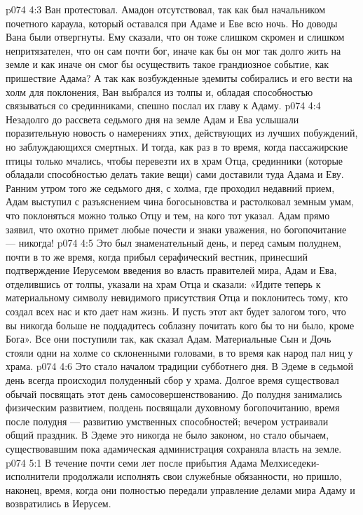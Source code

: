 \vs p074 4:3 Ван протестовал. Амадон отсутствовал, так как был начальником почетного караула, который оставался при Адаме и Еве всю ночь. Но доводы Вана были отвергнуты. Ему сказали, что он тоже слишком скромен и слишком непритязателен, что он сам почти бог, иначе как бы он мог так долго жить на земле и как иначе он смог бы осуществить такое грандиозное событие, как пришествие Адама? А так как возбужденные эдемиты собирались и его вести на холм для поклонения, Ван выбрался из толпы и, обладая способностью связываться со срединниками, спешно послал их главу к Адаму.
\vs p074 4:4 Незадолго до рассвета седьмого дня на земле Адам и Ева услышали поразительную новость о намерениях этих, действующих из лучших побуждений, но заблуждающихся смертных. И тогда, как раз в то время, когда пассажирские птицы только мчались, чтобы перевезти их в храм Отца, срединники (которые обладали способностью делать такие вещи) сами доставили туда Адама и Еву. Ранним утром того же седьмого дня, с холма, где проходил недавний прием, Адам выступил с разъяснением чина богосыновства и растолковал земным умам, что поклоняться можно только Отцу и тем, на кого тот указал. Адам прямо заявил, что охотно примет любые почести и знаки уважения, но богопочитание --- никогда!
\vs p074 4:5 Это был знаменательный день, и перед самым полуднем, почти в то же время, когда прибыл серафический вестник, принесший подтверждение Иерусемом введения во власть правителей мира, Адам и Ева, отделившись от толпы, указали на храм Отца и сказали: «Идите теперь к материальному символу невидимого присутствия Отца и поклонитесь тому, кто создал всех нас и кто дает нам жизнь. И пусть этот акт будет залогом того, что вы никогда больше не поддадитесь соблазну почитать кого бы то ни было, кроме Бога». Все они поступили так, как сказал Адам. Материальные Сын и Дочь стояли одни на холме со склоненными головами, в то время как народ пал ниц у храма.
\vs p074 4:6 \pc Это стало началом традиции субботнего дня. В Эдеме в седьмой день всегда происходил полуденный сбор у храма. Долгое время существовал обычай посвящать этот день самосовершенствованию. До полудня занимались физическим развитием, полдень посвящали духовному богопочитанию, время после полудня --- развитию умственных способностей; вечером устраивали общий праздник. В Эдеме это никогда не было законом, но стало обычаем, существовавшим пока адамическая администрация сохраняла власть на земле.
\vs p074 5:1 В течение почти семи лет после прибытия Адама Мелхиседеки\hyp{}исполнители продолжали исполнять свои служебные обязанности, но пришло, наконец, время, когда они полностью передали управление делами мира Адаму и возвратились в Иерусем.
